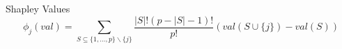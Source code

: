 \begin{frame}{Shapley Values}
\begin{equation}
	\phi_j(val)=\sum_{S\subseteq\{1,\ldots,p\} \backslash \{j\}}\frac{|S|!\left(p-|S|-1\right)!}{p!}\left(val\left(S\cup\{j\}\right)-val(S)\right)
\end{equation}
\end{frame}